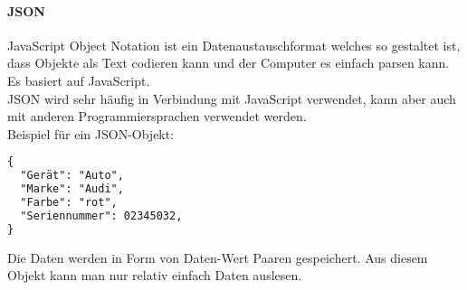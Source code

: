 \paragraph{JSON}
JavaScript Object Notation ist ein Datenaustauschformat welches so gestaltet ist, dass Objekte als Text codieren kann und der Computer es einfach parsen kann. Es basiert auf JavaScript.\\
JSON wird sehr häufig in Verbindung mit JavaScript verwendet, kann aber auch mit anderen Programmiersprachen verwendet werden.\\
Beispiel für ein JSON-Objekt:\\
\newpage
\begin{lstlisting}[language=html]
{
  "Gerät": "Auto",
  "Marke": "Audi",
  "Farbe": "rot",
  "Seriennummer": 02345032,
}
\end{lstlisting}
Die Daten werden in Form von Daten-Wert Paaren gespeichert. Aus diesem Objekt kann man nur relativ einfach Daten auslesen.\\ 



